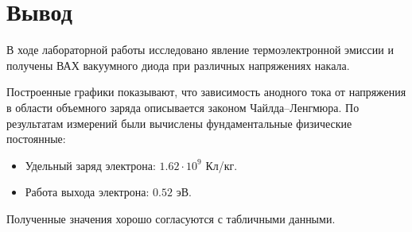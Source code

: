 \documentclass[a4paper,14pt]{extarticle}
\begin{document}
\section*{Вывод}

В ходе лабораторной работы исследовано явление термоэлектронной
эмиссии и получены ВАХ вакуумного диода при различных напряжениях накала.

Построенные графики показывают, что зависимость анодного тока от
напряжения в области объемного заряда описывается законом Чайлда–Ленгмюра.
По результатам измерений были вычислены фундаментальные физические постоянные:
\begin{itemize}
    \item Удельный заряд электрона: $1.62 \cdot 10^9$ Кл/кг.
    \item Работа выхода электрона: $0.52$ эВ.
\end{itemize}
Полученные значения хорошо согласуются с табличными данными.
\end{document}
